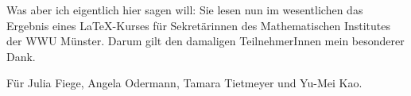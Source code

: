 Was aber ich eigentlich hier sagen will: Sie lesen nun im wesentlichen das Ergebnis eines \LaTeX-Kurses für Sekretärinnen des Mathematischen Institutes der WWU Münster. Darum gilt den damaligen TeilnehmerInnen mein besonderer Dank.

\newpage\mbox{}\vfill
\begin{center}
\large
Für Julia Fiege, Angela Odermann, Tamara Tietmeyer und Yu-Mei Kao.
\normalsize
\end{center}
\vfill\mbox{}\newpage
